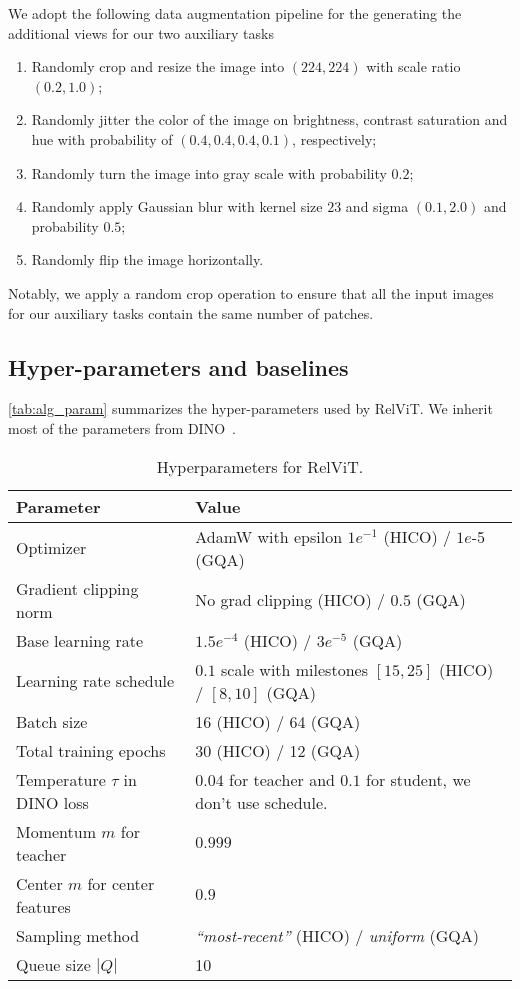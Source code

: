 \documentclass{article} \usepackage{iclr2022_conference,times}
\begin{document}
We adopt the following data augmentation pipeline for the generating the additional views for our two auxiliary tasks
\begin{enumerate}
    \item Randomly crop and resize the image into $(224, 224)$ with scale ratio $(0.2, 1.0)$;
    \item Randomly jitter the color of the image on brightness, contrast saturation and hue with probability of $(0.4, 0.4, 0.4, 0.1)$, respectively;
    \item Randomly turn the image into gray scale with probability $0.2$;
    \item Randomly apply Gaussian blur with kernel size $23$ and sigma $(0.1, 2.0)$ and probability $0.5$;
    \item Randomly flip the image horizontally.
\end{enumerate}

Notably, we apply a random crop operation to ensure that all the input images for our auxiliary tasks contain the same number of patches.

\subsection{Hyper-parameters and baselines}

\autoref{tab:alg_param} summarizes the hyper-parameters used by RelViT. We inherit most of the parameters from DINO~\citep{dino}.

\begin{table}[H]
\centering
\caption{Hyperparameters for RelViT.} 
\begin{tabular}{l|l}
\toprule
Parameter &  Value\\
\midrule
Optimizer &AdamW with epsilon $1e^{-1}$ (HICO) / $1e${-5} (GQA)\\
Gradient clipping norm & No grad clipping (HICO) / $0.5$ (GQA) \\
Base learning rate & $1.5e^{-4}$ (HICO) / $3e^{-5}$ (GQA) \\
Learning rate schedule & $0.1$ scale with milestones $[15, 25]$ (HICO) / $[8, 10]$ (GQA)\\
Batch size & 16 (HICO) / 64 (GQA) \\
Total training epochs & 30 (HICO) / 12 (GQA) \\
\midrule
Temperature $\tau$ in DINO loss & $0.04$ for teacher and $0.1$ for student, we don't use schedule. \\
Momentum $m$ for teacher & $0.999$ \\
Center $m$ for center features & $0.9$ \\
\midrule
Sampling method & \textit{``most-recent''} (HICO) / \textit{uniform} (GQA) \\
Queue size $|Q|$ & 10 \\
\bottomrule
\end{tabular}
\label{tab:alg_param}
\end{table}
\end{document}
